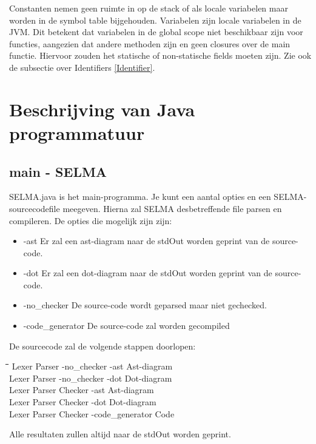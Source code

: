 \documentclass[]{article}
\begin{document}
Constanten nemen geen ruimte in op de stack of als locale variabelen maar worden in de symbol table bijgehouden. Variabelen zijn locale variabelen in de JVM. Dit betekent dat variabelen in de global scope niet beschikbaar zijn voor functies, aangezien dat andere methoden zijn en geen closures over de main functie. Hiervoor zouden het statische of non-statische fields moeten zijn. Zie ook de subsectie over Identifiers \ref{Identifier}.

\newpage
\section{Beschrijving van Java programmatuur}
%
%
\subsection{main - SELMA}
SELMA.java is het main-programma. Je kunt een aantal opties en een SELMA-sourcecodefile meegeven.
Hierna zal SELMA desbetreffende file parsen en compileren. De opties die mogelijk zijn zijn:
\begin{itemize}
\item -ast Er zal een ast-diagram naar de stdOut worden geprint van de source-code.
\item -dot Er zal een dot-diagram naar de stdOut worden geprint van de source-code.
\item -no\_checker De source-code wordt geparsed maar niet gechecked.
\item -code\_generator De source-code zal worden gecompiled
\end{itemize}
De sourcecode zal de volgende stappen doorlopen: \\
\begin{tabbing}
\hspace{5em}\=\hspace{5em}\=\hspace{7em}\=\hspace{5em}\=\hspace{10em}\=\kill
Lexer \>  Parser \> -no\_checker 	\>   		\> -ast \>  Ast-diagram \\
Lexer \>  Parser \> -no\_checker 	\>   		\> -dot \>  Dot-diagram \\
Lexer \>  Parser \>  				\>  Checker \> -ast \>  Ast-diagram \\
Lexer \>  Parser \>  				\>  Checker \> -dot \>  Dot-diagram \\
Lexer \>  Parser \>  				\>  Checker \> -code\_generator \>  Code 
\end{tabbing} 
Alle resultaten zullen altijd naar de stdOut worden geprint.
\end{document}
